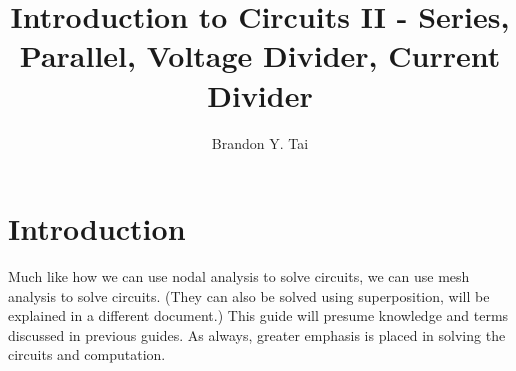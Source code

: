 \documentclass[12 pt,letterpaper]{article}
\begin{document}
\title{Introduction to Circuits II - Series, Parallel, Voltage Divider, Current Divider}
\author{Brandon Y. Tai}
\maketitle

\setcounter{section}{-1}

\section{Introduction}
	Much like how we can use nodal analysis to solve circuits, we can use mesh analysis to solve circuits. (They can also be solved using superposition, will be explained in a different document.) This guide will presume knowledge and terms discussed in previous guides. As always, greater emphasis is placed in solving the circuits and computation.
\end{document}

